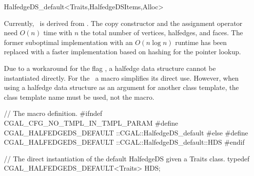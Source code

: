 \begin{ccRefClass}{HalfedgeDS_default<Traits,HalfedgeDSItems,Alloc>}
\ccImplementation

Currently, \ccRefName\ is derived from .
The copy constructor and the assignment operator need $O(n)$ time with
$n$ the total number of vertices, halfedges, and faces. The former 
suboptimal implementation with an $O(n \log n)$ runtime has been replaced
with a faster implementation based on hashing for the pointer lookup.

Due to a workaround for the flag ,
a halfedge data structure cannot be instantiated directly. For the
\ccRefName\ a macro simplifies its direct use. However, when using a
halfedge data structure as an argument for another class template,
the class template name  must be used, not 
the macro.

\begin{ccExampleCode}
// The macro definition.
#ifndef CGAL_CFG_NO_TMPL_IN_TMPL_PARAM
    #define CGAL_HALFEDGEDS_DEFAULT  ::CGAL::HalfedgeDS_default
#else
    #define CGAL_HALFEDGEDS_DEFAULT  ::CGAL::HalfedgeDS_default::HDS
#endif

// The direct instantiation of the default HalfedgeDS given a Traits class.
typedef CGAL_HALFEDGEDS_DEFAULT<Traits> HDS;
\end{ccExampleCode}

\end{ccRefClass}

\ccRefPageEnd

